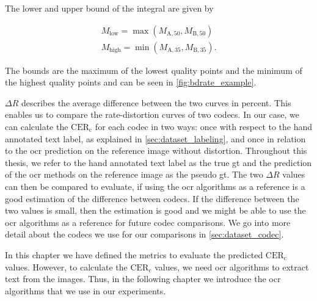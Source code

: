 The lower and upper bound of the integral are given by

\begin{equation}
    \begin{aligned}
        M_{\text{low}} = \max\left(M_{\text{A},50}, M_{\text{B},50}\right) \\
        M_{\text{high}} = \min\left(M_{\text{A},35}, M_{\text{B},35}\right).
    \end{aligned}
    \label{eq:bounds}
\end{equation}

The bounds are the maximum of the lowest quality points and the minimum of the highest quality points and can be seen in \autoref{fig:bdrate_example}.


$\Delta R$ describes the average difference between the two curves in percent.
This enables us to compare the rate-distortion curves of two codecs.
In our case, we can calculate the $\text{CER}_{\text{c}}$ for each codec in two ways:
once with respect to the hand annotated text label, as explained in \autoref{sec:dataset_labeling}, and once in relation to the \gls{ocr} prediction on the reference image without distortion.
Throughout this thesis, we refer to the hand annotated text label as the true \gls{gt} and the prediction of the \gls{ocr} methods on the reference image as the pseudo \gls{gt}.
The two $\Delta R$ values can then be compared to evaluate, if using the \gls{ocr} algorithms as a reference is a good estimation of the difference between codecs.
If the difference between the two values is small, then the estimation is good and we might be able to use the \gls{ocr} algorithms as a reference for future codec comparisons.
We go into more detail about the codecs we use for our comparisons in \autoref{sec:dataset_codec}.

In this chapter we have defined the metrics to evaluate the predicted $\text{CER}_{\text{c}}$ values.
However, to calculate the $\text{CER}_{\text{c}}$ values, we need \gls{ocr} algorithms to extract text from the images.
Thus, in the following chapter we introduce the \gls{ocr} algorithms that we use in our experiments.
